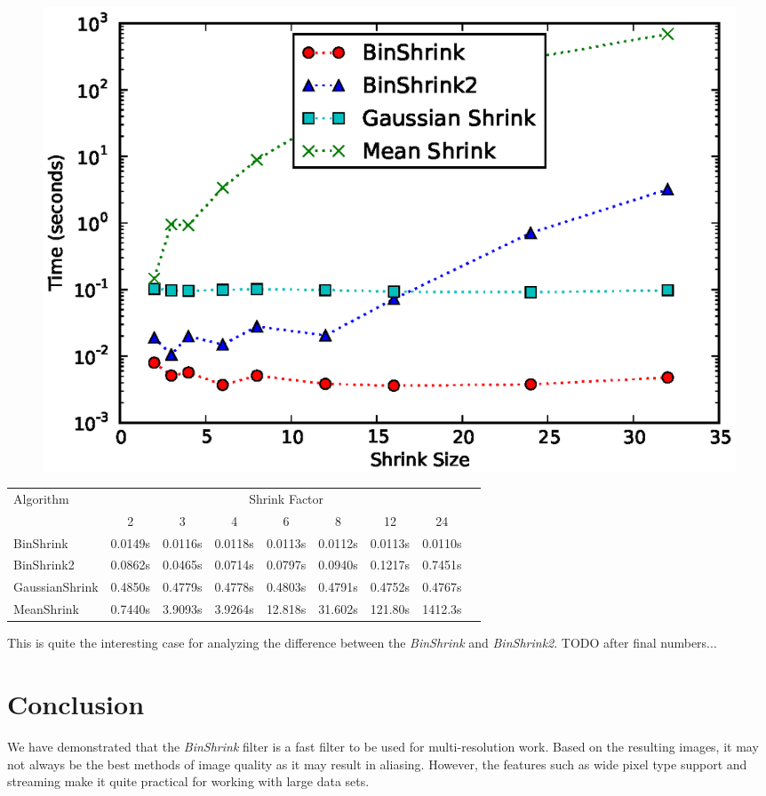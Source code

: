\documentclass{InsightArticle}
\begin{document}
\begin{figure}
  \centering
  \includegraphics[width=0.8\linewidth]{images/shrink_time}
  \label{fig:ShrinkPerformance}
\end{figure}

\begin{table}
\begin{center}
\begin{tabular}{l|*{7}{c}r}
Algorithm & \multicolumn{7}{c}{Shrink Factor} \\
  &            2 & 3 & 4 & 6 & 8 & 12 & 24 \\
\hline
BinShrink &     0.0149s & 0.0116s & 0.0118s & 0.0113s & 0.0112s & 0.0113s & 0.0110s\\
BinShrink2 &    0.0862s & 0.0465s & 0.0714s & 0.0797s & 0.0940s & 0.1217s & 0.7451s\\
GaussianShrink &0.4850s & 0.4779s & 0.4778s & 0.4803s & 0.4791s & 0.4752s & 0.4767s\\
MeanShrink &    0.7440s & 3.9093s & 3.9264s & 12.818s & 31.602s & 121.80s & 1412.3s\\
\end{tabular}
\label{tab:ShrinkPerformance}
\end{center}
\end{table}

This is quite the interesting case for analyzing the difference
between the \textit{BinShrink} and \textit{BinShrink2}. TODO after
final numbers...

\section{Conclusion}

We have demonstrated that the \textit{BinShrink} filter is a fast
filter to be used for multi-resolution work. Based on the resulting
images, it may not always be the best methods of image quality as it
may result in aliasing. However, the features such as wide pixel type
support and streaming make it quite practical for working with large
data sets.




\end{document}
